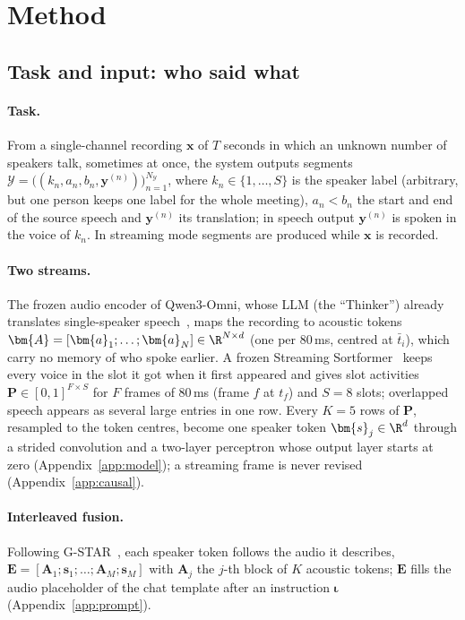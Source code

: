 \section{Method}
\label{sec:method}



\subsection{Task and input: who said what}
\label{sec:method-task}
\label{sec:method-audio}
\label{sec:method-spk}
\label{sec:method-fuse}

\paragraph{Task.} From a single-channel recording $\bm{x}$ of $T$ seconds in which an unknown number of speakers talk,
sometimes at once, the system outputs segments
$\mathcal{Y}=\big((k_n,a_n,b_n,\bm{y}^{(n)})\big)_{n=1}^{N_\mathcal{Y}}$, where $k_n\in\{1,\dots,S\}$ is the speaker label (arbitrary, but one person keeps one label for the whole meeting),
$a_n<b_n$ the start and end of the source speech and $\bm{y}^{(n)}$ its translation; in speech output $\bm{y}^{(n)}$ is
spoken in the voice of $k_n$. In streaming mode segments are produced while $\bm{x}$ is recorded.

\paragraph{Two streams.} The frozen audio encoder of Qwen3-Omni, whose LLM (the ``Thinker'') already translates
single-speaker speech~\citep{xu2025qwen3omni}, maps the recording to acoustic tokens
$\bm{A}=[\bm{a}_1;\dots;\bm{a}_N]\in\R^{N\times d}$ (one per 80\,ms, centred at $\bar{t}_i$), which carry no memory of
who spoke earlier. A frozen Streaming Sortformer~\citep{medennikov2025streaming} keeps every voice in the slot it got
when it first appeared and gives slot activities $\bm{P}\in[0,1]^{F\times S}$ for $F$ frames of 80\,ms (frame $f$ at
$t_f$) and $S=8$ slots; overlapped speech appears as several large entries in one row. Every $K=5$ rows of $\bm{P}$,
resampled to the token centres, become one speaker token $\bm{s}_j\in\R^{d}$ through a strided convolution and a
two-layer perceptron whose output layer starts at zero (Appendix~\ref{app:model}); a streaming frame is never revised
(Appendix~\ref{app:causal}).

\paragraph{Interleaved fusion.} Following G-STAR~\citep{peng2026gstar}, each speaker token follows the audio it describes,
$\bm{E}=[\bm{A}_1;\bm{s}_1;\dots;\bm{A}_M;\bm{s}_M]$ with $\bm{A}_j$ the $j$-th block of $K$ acoustic tokens;
$\bm{E}$ fills the audio placeholder of the chat template after an instruction
$\bm{\iota}$ (Appendix~\ref{app:prompt}).

